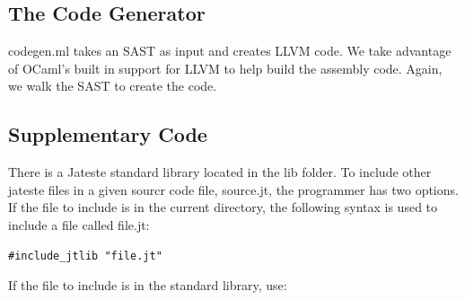 \documentclass{article}
\begin{document}
\subsection{The Code Generator}
codegen.ml takes an SAST as input and creates LLVM code. We take advantage of OCaml's built in support for LLVM to help build the assembly code. Again, we walk the SAST to create the code. 

\subsection{Supplementary Code} %
There is a Jateste standard library located in the lib folder. To include other jateste files in a given sourcr code file, source.jt, the programmer has two options. If the file to include is in the current directory, the following syntax is used to include a file called file.jt: 
\begin{lstlisting}
#include_jtlib "file.jt"
\end{lstlisting}
If the file to include is in the standard library, use:
\end{document}
